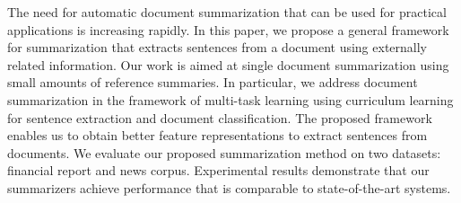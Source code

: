 The need for automatic document summarization that can be used for practical applications is increasing rapidly. In this paper, we propose a general framework for summarization that extracts sentences from a document using externally related information. Our work is aimed at single document summarization using small amounts of reference summaries. In particular, we address document summarization in the framework of multi-task learning using curriculum learning for sentence extraction and document classification. The proposed framework enables us to obtain better feature representations to extract sentences from documents. We evaluate our proposed summarization method on two datasets: financial report and news corpus. Experimental results demonstrate that our summarizers achieve performance that is comparable to state-of-the-art systems.
